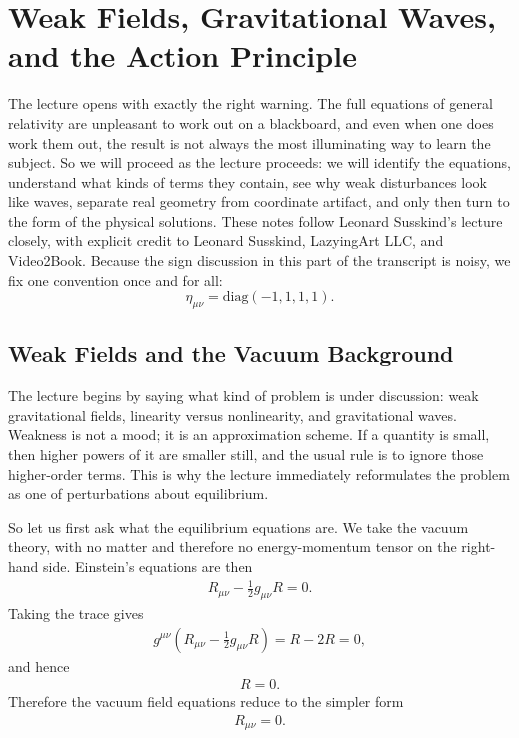 \chapter{Weak Fields, Gravitational Waves, and the Action Principle}

The lecture opens with exactly the right warning. The full equations of general relativity are unpleasant to work out on a blackboard, and even when one does work them out, the result is not always the most illuminating way to learn the subject. So we will proceed as the lecture proceeds: we will identify the equations, understand what kinds of terms they contain, see why weak disturbances look like waves, separate real geometry from coordinate artifact, and only then turn to the form of the physical solutions. These notes follow Leonard Susskind's lecture closely, with explicit credit to Leonard Susskind, LazyingArt LLC, and Video2Book. Because the sign discussion in this part of the transcript is noisy, we fix one convention once and for all:
\[
\eta_{\mu\nu}=\mathrm{diag}(-1,1,1,1).
\]

\section{Weak Fields and the Vacuum Background}

The lecture begins by saying what kind of problem is under discussion: weak gravitational fields, linearity versus nonlinearity, and gravitational waves. Weakness is not a mood; it is an approximation scheme. If a quantity is small, then higher powers of it are smaller still, and the usual rule is to ignore those higher-order terms. This is why the lecture immediately reformulates the problem as one of perturbations about equilibrium.

So let us first ask what the equilibrium equations are. We take the vacuum theory, with no matter and therefore no energy-momentum tensor on the right-hand side. Einstein's equations are then
\begin{align}
R_{\mu\nu}-\frac12 g_{\mu\nu}R=0.
\end{align}
Taking the trace gives
\begin{align}
g^{\mu\nu}\!\left(R_{\mu\nu}-\frac12 g_{\mu\nu}R\right)=R-2R=0,
\end{align}
and hence
\begin{align}
R=0.
\end{align}
Therefore the vacuum field equations reduce to the simpler form
\begin{align}
R_{\mu\nu}=0.
\end{align}


